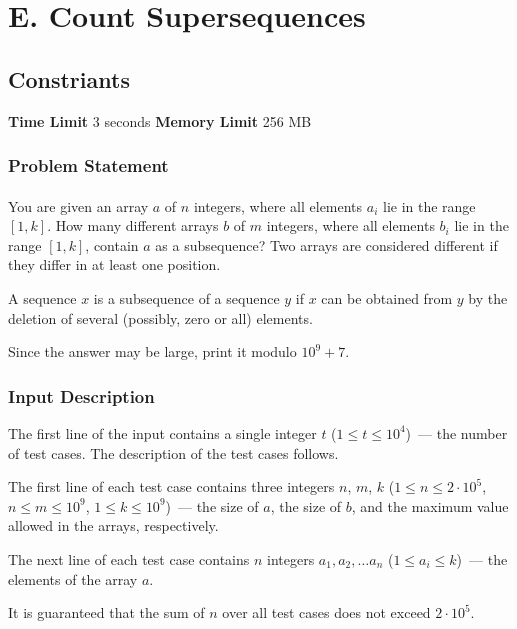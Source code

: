\documentclass{article}
\begin{document}
\section*{E. Count Supersequences}
\subsection*{Constriants}
\textbf{Time Limit}
3 seconds
\hfill
\textbf{Memory Limit}
256 MB
\subsubsection*{Problem Statement}
\paragraph{}You are given an array $a$ of $n$ integers, where all elements $a_i$ lie in the range $[1, k]$. How many different arrays $b$ of $m$ integers, where all elements $b_i$ lie in the range $[1, k]$, contain $a$ as a subsequence? Two arrays are considered different if they differ in at least one position.

A sequence $x$ is a subsequence of a sequence $y$ if $x$ can be obtained from $y$ by the deletion of several (possibly, zero or all) elements.

Since the answer may be large, print it modulo $10^9 + 7$.
\paragraph{}
\subsubsection*{Input Description}The first line of the input contains a single integer $t$ ($1 \le t \le 10^4$) — the number of test cases. The description of the test cases follows.

The first line of each test case contains three integers $n$, $m$, $k$ ($1 \le n \le 2\cdot 10^5$, $n \le m \le 10^9$, $1 \le k \le 10^9$) — the size of $a$, the size of $b$, and the maximum value allowed in the arrays, respectively.

The next line of each test case contains $n$ integers $a_1, a_2, \ldots a_n$ ($1\le a_i \le k$) — the elements of the array $a$.

It is guaranteed that the sum of $n$ over all test cases does not exceed $2\cdot 10^5$.
\paragraph{}
\end{document}
